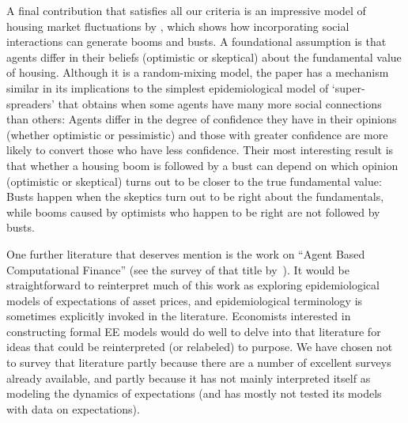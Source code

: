 A final contribution that satisfies all our criteria is an impressive model of housing market fluctuations by \href{https://www.journals.uchicago.edu/doi/abs/10.1086/686732}{\cite{burnside_understanding_2016}}, which shows how incorporating social interactions can generate booms and busts. A foundational assumption is that agents differ in their beliefs (optimistic or skeptical) about the fundamental value of housing.  Although it is a random-mixing model, the paper has a mechanism similar in its implications to the simplest epidemiological model of `super-spreaders' that obtains when some agents have many more social connections than others:  Agents differ in the degree of confidence they have in their opinions (whether optimistic or pessimistic) and those with greater confidence are more likely to convert those who have less confidence.  %
Their most interesting result is that whether a housing boom is followed by a bust can depend on which opinion (optimistic or skeptical) turns out to be closer to the true fundamental value:  Busts happen when the skeptics turn out to be right about the fundamentals, while booms caused by optimists who happen to be right are not followed by busts.

One further literature that deserves mention is the work on ``Agent Based Computational Finance'' (see the survey of that title by~\cite{lebaronAgentCompFinance}).  It would be straightforward to reinterpret much of this work as exploring epidemiological models of expectations of asset prices, and epidemiological terminology is sometimes explicitly invoked in the literature.  Economists interested in constructing formal EE models would do well to delve into that literature for ideas that could be reinterpreted (or relabeled) to purpose.  We have chosen not to survey that literature partly because there are a number of excellent surveys already available, and partly because it has not mainly interpreted itself as modeling the dynamics of expectations (and has mostly not tested its models with data on expectations).